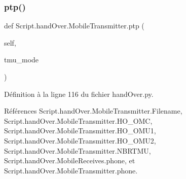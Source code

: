 \mbox{\label{classScript_1_1handOver_1_1MobileTransmitter_a0cb158c80c1244e3379fe4eb91dad8fd}} 
\subsubsection{\texorpdfstring{ptp()}{ptp()}}
{\footnotesize\ttfamily def Script.\+hand\+Over.\+Mobile\+Transmitter.\+ptp (\begin{DoxyParamCaption}\item[{}]{self,  }\item[{}]{tmu\+\_\+mode }\end{DoxyParamCaption})}



Définition à la ligne 116 du fichier hand\+Over.\+py.



Références Script.\+hand\+Over.\+Mobile\+Transmitter.\+Filename, Script.\+hand\+Over.\+Mobile\+Transmitter.\+H\+O\+\_\+\+O\+MC, Script.\+hand\+Over.\+Mobile\+Transmitter.\+H\+O\+\_\+\+O\+M\+U1, Script.\+hand\+Over.\+Mobile\+Transmitter.\+H\+O\+\_\+\+O\+M\+U2, Script.\+hand\+Over.\+Mobile\+Transmitter.\+N\+B\+R\+T\+MU, Script.\+hand\+Over.\+Mobile\+Receives.\+phone, et Script.\+hand\+Over.\+Mobile\+Transmitter.\+phone.


